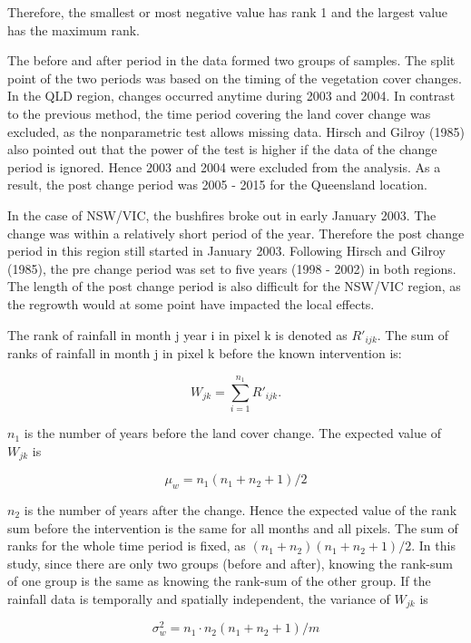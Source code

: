 \documentclass[fleqn,10pt,lineno]{wlpeerj} %
\begin{document}
\noindent Therefore, the smallest or most negative value has rank 1 and
the largest value has the maximum rank.

The before and after period in the data formed two groups of samples.
The split point of the two periods was based on the timing of the
vegetation cover changes. In the QLD region, changes occurred anytime
during 2003 and 2004. In contrast to the previous method, the time
period covering the land cover change was excluded, as the nonparametric
test allows missing data. Hirsch and Gilroy (1985) also pointed out that
the power of the test is higher if the data of the change period is
ignored. Hence 2003 and 2004 were excluded from the analysis. As a
result, the post change period was 2005 - 2015 for the Queensland
location.

In the case of NSW/VIC, the bushfires broke out in early January 2003.
The change was within a relatively short period of the year. Therefore
the post change period in this region still started in January 2003.
Following Hirsch and Gilroy (1985), the pre change period was set to
five years (1998 - 2002) in both regions. The length of the post change
period is also difficult for the NSW/VIC region, as the regrowth would
at some point have impacted the local effects.

The rank of rainfall in month j year i in pixel k is denoted as
\(R'_{ijk}\). The sum of ranks of rainfall in month j in pixel k before
the known intervention is:

\begin{equation}
  W_{jk} = \sum_{i=1}^{n_1}R'_{ijk}.
  \label{eq:Wj}
\end{equation}

\(n_1\) is the number of years before the land cover change. The
expected value of \(W_{jk}\) is

\begin{equation}
  \mu_w=n_1(n_1+n_2+1)/2
\end{equation}

\(n_2\) is the number of years after the change. Hence the expected
value of the rank sum before the intervention is the same for all months
and all pixels. The sum of ranks for the whole time period is fixed, as
\((n_1+n_2)(n_1+n_2+1)/2\). In this study, since there are only two
groups (before and after), knowing the rank-sum of one group is the same
as knowing the rank-sum of the other group. If the rainfall data is
temporally and spatially independent, the variance of \(W_{jk}\) is

\begin{equation}
  \sigma^2_w = n_1\cdot n_2(n_1+n_2+1)/m
\end{equation}
\end{document}
